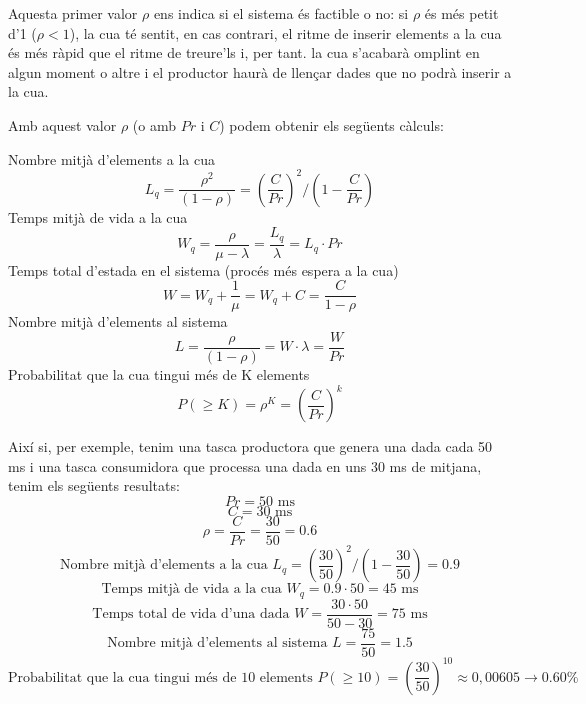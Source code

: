 Aquesta primer valor $\rho$ ens indica si el sistema és factible o no: si $\rho$ és més petit d'1 ($\rho < 1$), la cua té sentit, en cas contrari, el ritme de inserir elements a la cua és més ràpid que el ritme de treure'ls i, per tant. la cua s'acabarà omplint en algun moment o altre i el productor haurà de llençar dades que no podrà inserir a la cua.

Amb aquest valor $\rho$ (o amb $Pr$ i $C$) podem obtenir els següents càlculs:

Nombre mitjà d'elements a la cua
\begin{equation}
 L_q = \frac{\rho^2}{(1-\rho)}  = \left( \frac{C}{Pr} \right)^2 /  \left( 1 - \frac{C}{Pr}\right)
\end{equation}
Temps mitjà de vida a la cua
\begin{equation}
 W_q =  \frac{\rho}{\mu - \lambda} = \frac{L_q}{\lambda} = L_q \cdot Pr
\end{equation}
Temps total d'estada en el sistema (procés més espera a la cua)
\begin{equation}
 W = W_q + \frac{1}{\mu} = W_q +C = \frac{C}{1-\rho}
\end{equation}
Nombre mitjà d'elements al sistema
\begin{equation}
 L = \frac{\rho}{(1-\rho)}  = W \cdot \lambda = \frac{W}{Pr}
\end{equation}
Probabilitat que la cua tingui més de K elements
\begin{equation}
\label{eq:Prob_queue_full}
 P(\geqslant K) = \rho^K =  \left( \frac{C}{Pr} \right)^k 
\end{equation}

Així si, per exemple, tenim una tasca productora que genera una dada cada 50 ms i una tasca consumidora que processa una dada en uns 30 ms de mitjana, tenim els següents resultats:
\begin{equation*}
Pr = 50 \text{ ms}
\end{equation*}
\begin{equation*}
C = 30 \text{ ms}
\end{equation*}
\begin{equation*}
\rho = \frac{C}{Pr} = \frac{30}{50} = 0.6
\end{equation*}
\begin{equation*}
\text{Nombre mitjà d'elements a la cua } L_q = \left(\frac{30}{50}\right)^2 / \left(1 - \frac{30}{50}\right)  = 0.9
\end{equation*}
\begin{equation*}
\text{Temps mitjà de vida a la cua } W_q = 0.9 \cdot 50 = 45 \text{ ms}
\end{equation*}
\begin{equation*}
\text{Temps total de vida d'una dada } W =  \frac{30  \cdot 50}{50-30} = 75 \text{ ms}
\end{equation*}
\begin{equation*}
\text{Nombre mitjà d'elements al sistema } L =  \frac{75}{50} = 1.5
\end{equation*}
\begin{equation*}
\text{Probabilitat que la cua tingui més de 10 elements } P(\geqslant 10) =  \left(\frac{30}{50}\right)^{10} \approx 0,00605 \rightarrow 0.60 \%
\end{equation*}

